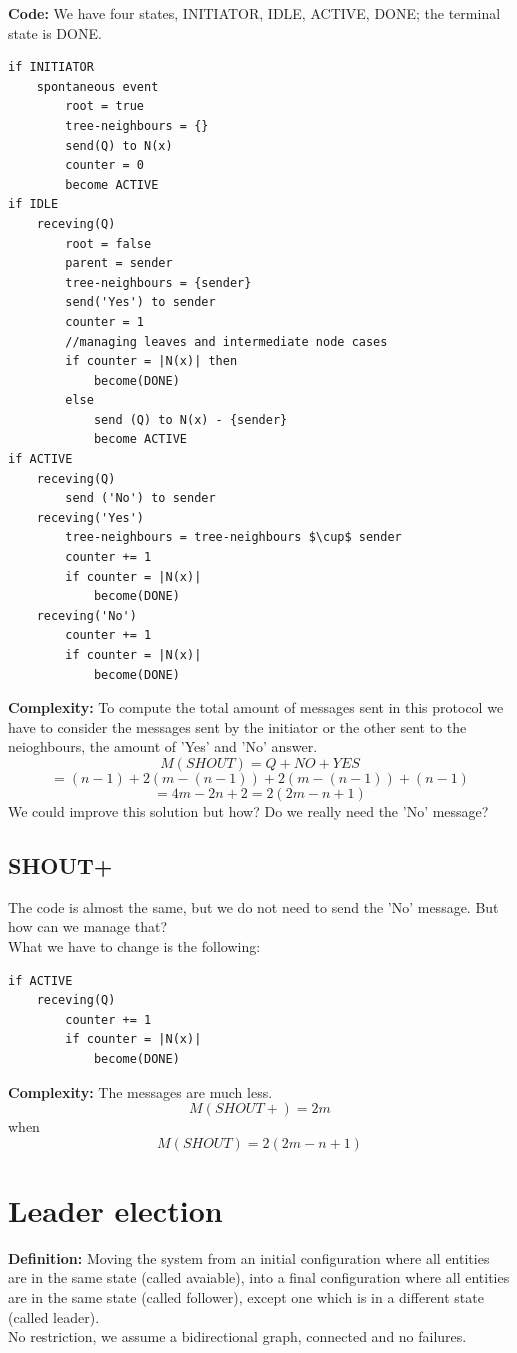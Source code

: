 \documentclass[paper=a4, fontsize=11pt]{scrartcl} %
\numberwithin{equation}{section} %
\numberwithin{figure}{section} %
\numberwithin{table}{section} %
\begin{document}
\newpage
\textbf{Code:} We have four states, INITIATOR, IDLE, ACTIVE, DONE; the terminal state is DONE.
\begin{lstlisting}
if INITIATOR
	spontaneous event
		root = true
		tree-neighbours = {}
		send(Q) to N(x)
		counter = 0
		become ACTIVE
if IDLE
	receving(Q)
		root = false
		parent = sender
		tree-neighbours = {sender}
		send('Yes') to sender
		counter = 1
		//managing leaves and intermediate node cases
		if counter = |N(x)| then
			become(DONE)
		else
			send (Q) to N(x) - {sender}
			become ACTIVE			 
if ACTIVE
	receving(Q)
		send ('No') to sender
	receving('Yes')
		tree-neighbours = tree-neighbours $\cup$ sender
		counter += 1
		if counter = |N(x)|
			become(DONE)
	receving('No')
		counter += 1
		if counter = |N(x)|
			become(DONE)			
\end{lstlisting}
\textbf{Complexity:} To compute the total amount of messages sent in this protocol we have to consider the messages sent by the initiator or the other sent to the neioghbours, the amount of 'Yes' and 'No' answer.
$$ M(SHOUT) = Q + NO  + YES $$
$$=(n-1)+ 2(m-(n-1)) + 2(m-(n-1)) + (n-1)$$
$$= 4m - 2n + 2 = 2(2m-n+1)$$
We could improve this solution but how? Do we really need the 'No' message?
\subsection*{SHOUT+}
The code is almost the same, but we do not need to send the 'No' message. But how can we manage that?\\
What we have to change is the following:
\begin{lstlisting}
if ACTIVE
	receving(Q)
		counter += 1
		if counter = |N(x)|
			become(DONE)
\end{lstlisting}
\textbf{Complexity:} The messages are much less. 
$$M(SHOUT+) = 2m$$ when $$M(SHOUT) = 2(2m -n+1)$$
\section*{Leader election}
\textbf{Definition:} Moving the system from an initial configuration where all entities are in the same state (called avaiable), into a final configuration where all entities are in the same state (called follower), except one which is in a different state (called leader).\\
No restriction, we assume a bidirectional graph, connected and no failures.\\
\end{document}

